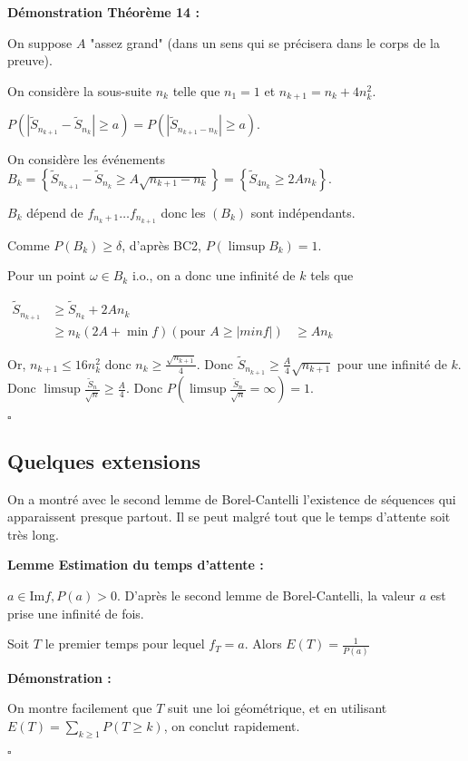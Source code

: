 \documentclass[10pt,a4paper,notitlepage ]{report}
\newcommand{\1}{\mathds 1}
\renewcommand{\Im}{\mathrm{Im }}
\newcounter{th}
\newenvironment{demo}[1][]{

	\textbf{Démonstration #1 :}
}{\begin{flushright}
	$\square$
\end{flushright}
}
\newenvironment{lemme}[1][]{
	\begin{tcolorbox}
		\textbf{Lemme #1 : }
	}
	{\end{tcolorbox}}
\begin{document}
\begin{demo}[Théorème 14]
	On suppose $A$ "assez grand" (dans un sens qui se précisera dans le corps de la preuve).
	
	On considère la sous-suite $n_k$ telle que $n_1=1$ et $n_{k+1}=n_k+4n_k^2$.
	
	$P\left( \left|\tilde S_{n_{k+1}} - \tilde S_{n_k} \right| \ge a \right) = P\left( \left|\tilde S_{n_{k+1} - n_k} \right| \ge a\right)$.
	
	On considère les événements $B_k = \left\{ \tilde S_{n_{k+1}} - \tilde S_{n_k} \ge A\sqrt{n_{k+1} - n_k} \right\} = \left\{ \tilde S_{4n_k} \ge 2An_k \right\}$.
	
	$B_k$ dépend de $f_{n_k+1} \dots f_{n_{k+1}}$ donc les $(B_k)$ sont indépendants.
	
	Comme $P(B_k) \ge \delta$, d'après BC2, $P(\limsup B_k) = 1$.
	
	Pour un point $\omega \in B_k \text{ i.o.}$, on a donc une infinité de $k$ tels que
	
	$\begin{aligned}
		\tilde S_{n_{k+1}} &\ge \tilde S_{n_k} +2An_k \\
		&\ge n_k(2A+\min f)
		(\text{pour } A \ge |min f|) &\ge An_k
		\end{aligned}$
	
	Or, $n_{k+1} \le 16n_k^2$ donc $n_k \ge \frac {\sqrt{n_{k+1}}} 4$. Donc $\tilde S_{n_{k+1}} \ge \frac A 4 \sqrt{n_{k+1}}$ pour une infinité de $k$. Donc $\limsup \frac {\tilde S_n} {\sqrt n} \ge \frac A 4$. Donc $P(\limsup \frac{\tilde S_n}{\sqrt n} = \infty) = 1$.
\end{demo}

\subsection{Quelques extensions}

On a montré avec le second lemme de Borel-Cantelli l'existence de séquences qui apparaissent presque partout. Il se peut malgré tout que le temps d'attente soit très long.

\begin{lemme}[Estimation du temps d'attente]
	$a\in \Im f, P(a) > 0$. D'après le second lemme de Borel-Cantelli, la valeur $a$ est prise une infinité de fois.
	
	Soit $T$ le premier temps pour lequel $f_T=a$. Alors $E(T) = \frac 1 {P(a)}$
\end{lemme}

\begin{demo}
	On montre facilement que $T$ suit une loi géométrique, et en utilisant $E(T) = \underset{k\ge 1} \sum P(T\ge k)$, on conclut rapidement.
\end{demo}
\end{document}
